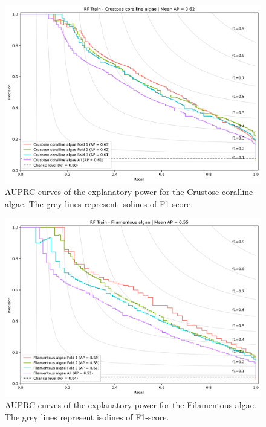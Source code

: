 \begin{figure}
\hypertarget{fig:chap3figS26}{%
\centering
\includegraphics{03-Chapitre3/figures/supplementary/03-precision_recall_curve_train_rf_Crustose coralline algae.png}
\caption{AUPRC curves of the explanatory power for the Crustose
coralline algae. The grey lines represent isolines of
F1-score.}\label{fig:chap3figS26}
}
\end{figure}

\begin{figure}
\hypertarget{fig:chap3figS27}{%
\centering
\includegraphics{03-Chapitre3/figures/supplementary/03-precision_recall_curve_train_rf_Filamentous algae.png}
\caption{AUPRC curves of the explanatory power for the Filamentous
algae. The grey lines represent isolines of
F1-score.}\label{fig:chap3figS27}
}
\end{figure}


